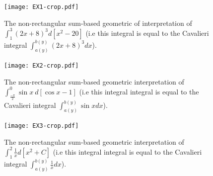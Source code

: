 \documentclass{article}
\theoremstyle{theorem}
\theoremstyle{definition}
\begin{document}
 \begin{figure}[htb]
 \centering
 \texttt{[image: EX1-crop.pdf]}
 \caption{The non-rectangular sum-based geometric of interpretation of $\int_{1}^3 (2x+8)^3 d[x^2-20]$ (i.e this integral is equal to the 
 Cavalieri integral $\int_{a(y)}^{b(y)} (2x+8)^3 dx$).}
 \label{fig:ex1_sec}
 \end{figure}

\begin{figure}[htb]
\centering
\texttt{[image: EX2-crop.pdf]}
\caption{The non-rectangular sum-based geometric interpretation of $\int_{\frac{-\pi}{2}}^0 \sin{x}~d[\cos{x}-1]$ (i.e this integral integral is equal to the 
 Cavalieri integral $\int_{a(y)}^{b(y)} \sin{x} dx$).}
\label{fig:ex2_sec}
\end{figure}

\begin{figure}[htb]
\centering
\texttt{[image: EX3-crop.pdf]}
\caption{The non-rectangular sum-based geometric interpretation of $\int_1^2 \frac{1}{x} d[x^2+C]$ (i.e this integral integral is equal to the 
 Cavalieri integral $\int_{a(y)}^{b(y)} \frac{1}{x} dx$).}
\label{fig:ex3_sec}
\end{figure}
\end{document}
